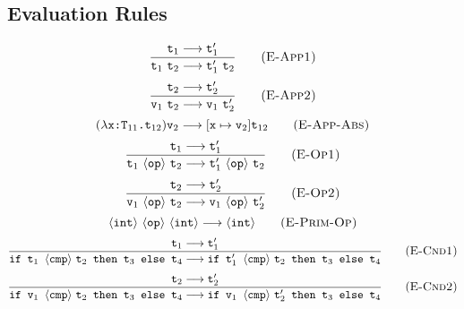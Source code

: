 \documentclass[a4paper]{article}
\begin{document}
\subsection{Evaluation Rules}
\begin{equation}
	\frac{\text{\tt t}_{1}\longrightarrow\text{\tt t}^{\prime}_{1}}
	{\text{\tt t}_{1}\ \text{\tt t}_{2}\longrightarrow\text{\tt t}^{\prime}_{1}\ \text{\tt t}_{2}}
	\tag{\sc E-App1}
\end{equation}
\begin{equation}
	\frac{\text{\tt t}_{2}\longrightarrow\text{\tt t}^{\prime}_{2}}
	{\text{\tt v}_{1}\ \text{\tt t}_{2}\longrightarrow\text{\tt v}_{1}\ \text{\tt t}^{\prime}_{2}}
	\tag{\sc E-App2}
\end{equation}
\begin{equation}
	(\lambda\text{\tt x:T$_{11}$.t$_{12}$})\text{\tt v}_2\longrightarrow[\text{\tt x}\mapsto\text{\tt v}_2]\text{\tt t}_{12}\tag{\sc E-App-Abs}
\end{equation}
\begin{equation}
	\frac{\text{\tt t}_1\longrightarrow\text{\tt t}^{\prime}_1}
	{\text{\tt t}_1\ \langle\text{\tt op}\rangle\ \text{\tt t}_2 \longrightarrow \text{\tt t}^{\prime}_1\ \langle\text{\tt op}\rangle\ \text{\tt t}_2}
	\tag{\sc E-Op1}
\end{equation}
\begin{equation}
	\frac{\text{\tt t}_2\longrightarrow\text{\tt t}^{\prime}_2}
	{\text{\tt v}_1\ \langle\text{\tt op}\rangle\ \text{\tt t}_2 \longrightarrow \text{\tt v}_1\ \langle\text{\tt op}\rangle\ \text{\tt t}^{\prime}_2}
	\tag{\sc E-Op2}
\end{equation}
\begin{equation}
	\langle\text{\tt int}\rangle\ \langle\text{\tt op}\rangle\ \langle\text{\tt int}\rangle \longrightarrow\langle\text{\tt int}\rangle
	\tag{\sc E-Prim-Op}
\end{equation}
\begin{equation}
	\frac{\text{\tt t}_1\longrightarrow\text{\tt t}^{\prime}_1}
	{\text{\tt if t$_1$ }\langle\text{\tt cmp}\rangle\text{ \tt t$_2$ then t$_3$ else t$_4$}\longrightarrow
	\text{\tt if t$^\prime_1$ }\langle\text{\tt cmp}\rangle\text{ \tt t$_2$ then t$_3$ else t$_4$}}
	\tag{\sc E-Cnd1}
\end{equation}
\begin{equation}
	\frac{\text{\tt t}_2\longrightarrow\text{\tt t}^{\prime}_2}
	{\text{\tt if v$_1$ }\langle\text{\tt cmp}\rangle\text{ \tt t$_2$ then t$_3$ else t$_4$}\longrightarrow
	\text{\tt if v$_1$ }\langle\text{\tt cmp}\rangle\text{ \tt t$^\prime_2$ then t$_3$ else t$_4$}}
	\tag{\sc E-Cnd2}
\end{equation}
\end{document}

